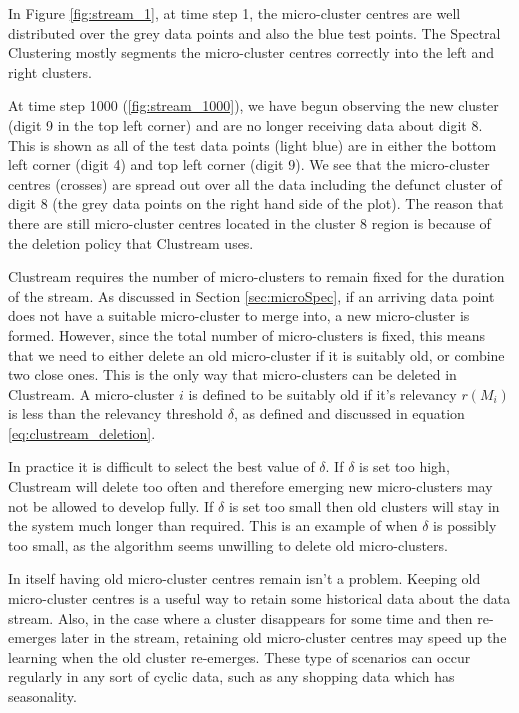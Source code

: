In Figure \ref{fig:stream_1}, at time step 1, the micro-cluster centres are well distributed over the grey data points and also the blue test points. The Spectral Clustering mostly segments the micro-cluster centres correctly into the left and right clusters.

At time step 1000 (\ref{fig:stream_1000}), we have begun observing the new cluster (digit 9 in the top left corner) and are no longer receiving data about digit 8. This is shown as all of the test data points (light blue) are in either the bottom left corner (digit 4) and top left corner (digit 9). We see that the micro-cluster centres (crosses) are spread out over all the data including the defunct cluster of digit 8 (the grey data points on the right hand side of the plot).  The reason that there are still micro-cluster centres located in the cluster 8 region is because of the deletion policy that Clustream uses.

Clustream requires the number of micro-clusters to remain fixed for the duration of the stream. As discussed in Section \ref{sec:microSpec}, if an arriving data point does not have a suitable micro-cluster to merge into, a new micro-cluster is formed. However, since the total number of micro-clusters is fixed, this means that we need to either delete an old micro-cluster if it is suitably old, or combine two close ones. This is the only way that micro-clusters can be deleted in Clustream.  A micro-cluster $i$ is defined to be suitably old if it's relevancy $r(M_i)$ is less than the relevancy threshold $\delta$, as defined and discussed in equation \eqref{eq:clustream_deletion}.

In practice it is difficult to select the best value of $\delta$. If $\delta$ is set too high, Clustream will delete too often and therefore emerging new micro-clusters may not be allowed to develop fully. If $\delta$ is set too small then old clusters will stay in the system much longer than required. This is an example of when $\delta$ is possibly too small, as the algorithm seems unwilling to delete old micro-clusters. %

In itself having old micro-cluster centres remain isn't a problem. Keeping old micro-cluster centres is a useful way to retain some historical data about the data stream. Also, in the case where a cluster disappears for some time and then re-emerges later in the stream, retaining old micro-cluster centres may speed up the learning when the old cluster re-emerges. These type of scenarios can occur regularly in any sort of cyclic data, such as any shopping data which has seasonality. 

